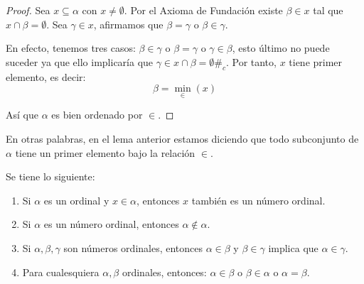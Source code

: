 \documentclass[12pt]{report}
\newcounter{it}
\theoremstyle{largebreak}
\newcommand\contradiction{\ensuremath{\#_c}}
\begin{document}
    \begin{proof}
        Sea $x\subseteq\alpha$ con $x\neq\emptyset$. Por el Axioma de Fundación existe $\beta\in x$ tal que $x\cap\beta=\emptyset$. Sea $\gamma\in x$, afirmamos que $\beta=\gamma$ o $\beta\in\gamma$.

        En efecto, tenemos tres casos: $\beta\in\gamma$ o $\beta=\gamma$ o $\gamma\in\beta$, esto último no puede suceder ya que ello implicaría que $\gamma\in x\cap\beta=\emptyset$\contradiction. Por tanto, $x$ tiene primer elemento, es decir:
        \begin{equation*}
            \beta=\min_{\in}(x)
        \end{equation*}

        Así que $\alpha$ es bien ordenado por $\in$.
    \end{proof}

    \begin{obs}
        En otras palabras, en el lema anterior estamos diciendo que todo subconjunto de $\alpha$ tiene un primer elemento bajo la relación $\in$.
    \end{obs}

    \begin{theor}
        Se tiene lo siguiente:
        \begin{enumerate}[label = \textit{(\arabic*)}]
            \item Si $\alpha$ es un ordinal y $x\in\alpha$, entonces $x$ también es un número ordinal.
            \item Si $\alpha$ es un número ordinal, entonces $\alpha\notin\alpha$.
            \item Si $\alpha,\beta,\gamma$ son números ordinales, entonces $\alpha\in\beta$ y $\beta\in\gamma$ implica que $\alpha\in\gamma$.
            \item Para cualesquiera $\alpha,\beta$ ordinales, entonces: $\alpha\in\beta$ o $\beta\in\alpha$ o $\alpha=\beta$.
        \end{enumerate}
    \end{theor}
\end{document}
